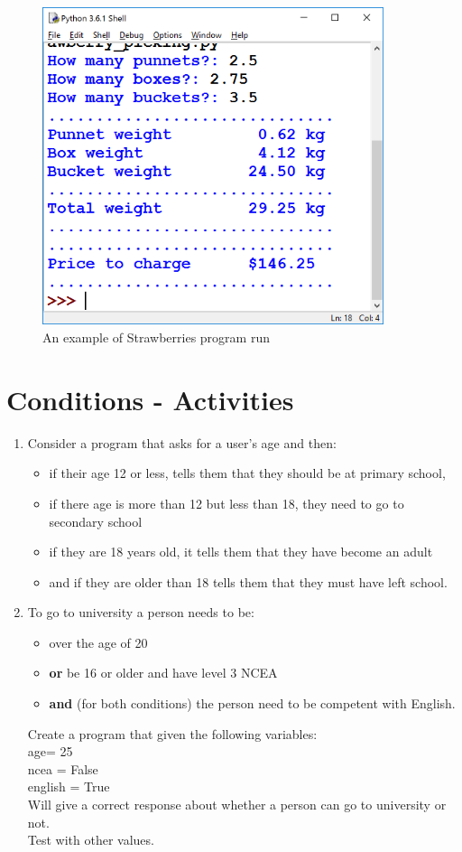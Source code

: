 \documentclass[a4paper,12pt]{article}
\begin{document}
\begin{figure} [!h]
	\centering
	\includegraphics[width=10cm]{screen_shots/strawberries.png}
	\caption*{An example of Strawberries program run}
\end{figure}
\newpage


\newpage
\section{Conditions - Activities}

\begin{enumerate}
	\item Consider a program that asks for a user’s age and then:
\begin{itemize}
	\item if their age 12 or less, tells them that they should be at primary school,
	\item if there age is more than 12 but less than 18, they need to go to secondary school
	\item if they are 18 years old, it tells them that they have become an adult
	\item and if they are older than 18 tells them that they must have left school.
\end{itemize}
\item 	To go to university a person needs to be:
\begin{itemize}
	\item over the age of 20
	\item \textbf{or} be 16 or older and have level 3 NCEA 
	\item \textbf{and} (for both conditions) the person need to be competent with English.
\end{itemize} 
Create a program that given the following variables:\\
age= 25\\
ncea = False\\
english = True\\
Will give a correct response about whether a person can go to university or not.\\
Test with other values.
\end{enumerate}
\end{document}
